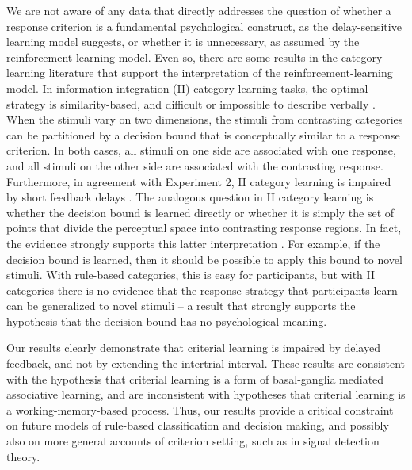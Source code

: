 \documentclass[doc, floatsintext]{apa7}
\begin{document}
We are not aware of any data that directly addresses the
question of whether a response criterion is a fundamental
psychological construct, as the delay-sensitive learning
model suggests, or whether it is unnecessary, as assumed by
the reinforcement learning model. Even so, there are some
results in the category-learning literature that support the
interpretation of the reinforcement-learning model. In
information-integration (II) category-learning tasks, the
optimal strategy is similarity-based, and difficult or
impossible to describe verbally
\parencite[e.g.,][]{AshbyValentin2018}. When the stimuli
vary on two dimensions, the stimuli from contrasting
categories can be partitioned by a decision bound that is
conceptually similar to a response criterion. In both cases,
all stimuli on one side are associated with one response,
and all stimuli on the other side are associated with the
contrasting response. Furthermore, in agreement with
Experiment 2, II category learning is impaired by short
feedback delays \parencite{MaddoxAshbyBohil2003,
MaddoxIng2005}. The analogous question in II category
learning is whether the decision bound is learned directly
or whether it is simply the set of points that divide the
perceptual space into contrasting response regions.  In
fact, the evidence strongly supports this latter
interpretation \parencite{AshbyWaldron1999, CasaleEtAl2012}.
For example, if the decision bound is learned, then it
should be possible to apply this bound to novel stimuli.
With rule-based categories, this is easy for participants,
but with II categories there is no evidence that the
response strategy that participants learn can be generalized
to novel stimuli \parencite{CasaleEtAl2012} -- a result that
strongly supports the hypothesis that the decision bound has
no psychological meaning. 

Our results clearly demonstrate that criterial learning is
impaired by delayed feedback, and not by extending the
intertrial interval. These results are consistent with the
hypothesis that criterial learning is a form of
basal-ganglia mediated associative learning, and are
inconsistent with hypotheses that criterial learning is a
working-memory-based process. Thus, our results provide a
critical constraint on future models of rule-based
classification and decision making, and possibly also on
more general accounts of criterion setting, such as in
signal detection theory.
\end{document}

